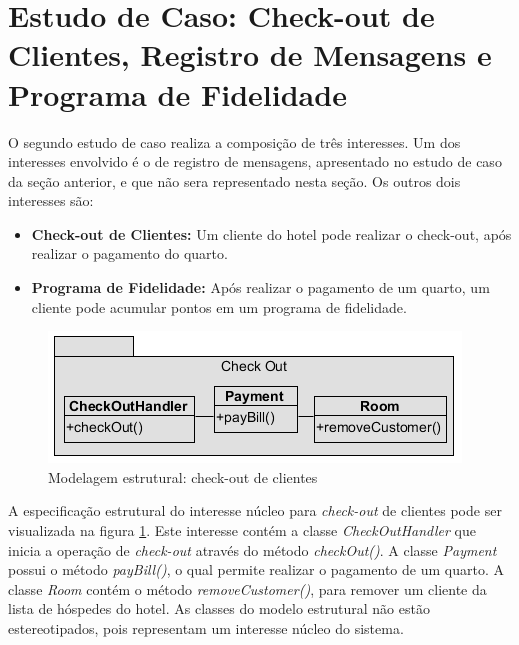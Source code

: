 \section{Estudo de Caso: Check-out de Clientes, Registro de Mensagens e Programa de Fidelidade}

O segundo estudo de caso realiza a composição de três interesses. Um dos interesses envolvido é o de registro de mensagens, apresentado no estudo de
caso da seção anterior, e que não sera representado nesta seção. Os outros dois interesses são:

\begin{itemize}
  \item \textbf{Check-out de Clientes:} Um cliente do hotel pode realizar o check-out, após realizar o pagamento do quarto.
  \item \textbf{Programa de Fidelidade:} Após realizar o pagamento de um quarto, um cliente pode acumular pontos em um programa de fidelidade.
\end{itemize}

  \begin{figure}[!h]
	\centering
	\includegraphics{img/case_study_structural_check_out.png}
	\caption{Modelagem estrutural: check-out de clientes}\label{fig:case_study_structural_check_out}
  \end{figure}

A especificação estrutural do interesse núcleo para \textit{check-out} de clientes pode ser visualizada na figura
\ref{fig:case_study_structural_check_out}. Este interesse contém a classe \textit{CheckOutHandler} que inicia a operação de \textit{check-out} através 
do método \textit{checkOut()}. A classe \textit{Payment} possui o método \textit{payBill()}, o qual permite realizar o pagamento de um quarto. A
classe \textit{Room} contém o método \textit{removeCustomer()}, para remover um cliente da lista de hóspedes do hotel. As classes do modelo estrutural
não estão estereotipados, pois representam um interesse núcleo do sistema.

